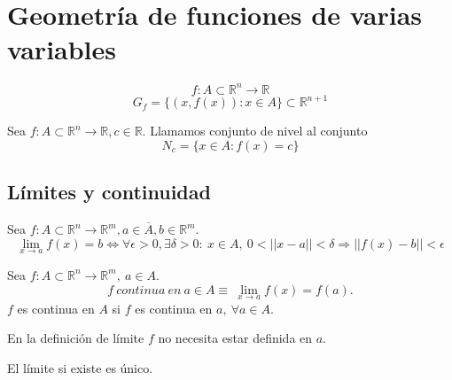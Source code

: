 \chapter{Geometría de funciones de varias variables}

\begin{nota}
\[ f:A\subset \mathbb{R}^n \rightarrow \mathbb{R} \]  \[ G_f = \{(x,f(x)): x \in A \} \subset \mathbb{R}^{n+1} \]
\end{nota}

\begin{defn}
Sea $f:A\subset \mathbb{R}^n \rightarrow \mathbb{R}, c \in \mathbb{R}$.
Llamamos conjunto de nivel al conjunto \[ N_c = \{ x \in A: f(x) = c \} \]
\end{defn}

\section{Límites y continuidad}
\begin{defn}
Sea $f:A\subset \mathbb{R}^n \rightarrow \mathbb{R}^m, a \in \overline{A}, b \in \mathbb{R}^m$.
\[ \lim_{x\rightarrow a} f(x) = b \Leftrightarrow \forall \epsilon > 0, \exists \delta > 0: \ x \in A, \ 0 < ||x-a|| < \delta \Rightarrow ||f(x)-b|| < \epsilon\]
\end{defn}

\begin{defn}
Sea $f:A\subset \mathbb{R}^n \rightarrow \mathbb{R}^m, \ a \in A$.
\[ f \ continua \ en \ a\in A \equiv \ \lim_{x\rightarrow a} f(x) = f(a). \]
$f$ es continua en $A$ si $f$ es continua en $a, \ \forall a \in A$.
\end{defn}

\begin{obs}
En la definición de límite $f$ no necesita estar definida en $a$.
\end{obs}

\begin{obs}
El límite si existe es único.
\end{obs}

